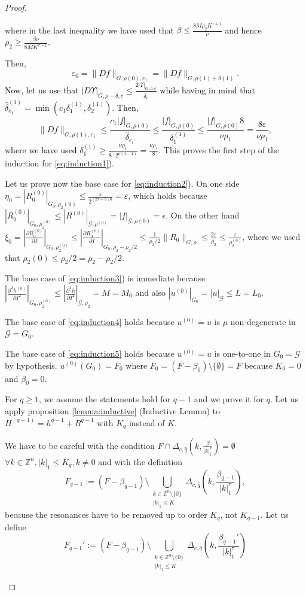 \begin{proof}
\begin{enumerate}
where in the last inequality we have used that $\beta \leq \frac{8M\rho_2 K^{\tau+1}}{\nu}$ and hence $\rho_2 \geq \frac{\beta\nu}{8 M K^{\tau+1}}$.

Then,
\textcolor{black}{
$$\varepsilon_0 = \|Df\|_{G,\rho(0),c_1} = \|Df\|_{G,\rho(1)+\delta(1)}.$$
Now, let us use that $|D\Upsilon|_{G,\rho-\delta,c}\leq \frac{2|\Upsilon|_{G,\rho,c}}{\hat \delta_c}$ while having in mind that $\hat \delta_{c_1}^{(1)} = \min(c_1\delta_1^{(1)},\delta_2^{(1)})$.
Then,
$$\|D f\|_{G,\rho(1),c_1} \leq \frac{c_1 |f|_{G,\rho(0)}}{\hat \delta_{c_1}} \leq \frac{|f|_{G,\rho(0)}}{\delta_1^{(1)}} \leq \frac{|f|_{G,\rho(0)} 8}{\nu \rho_1} = \frac{8\varepsilon}{\nu \rho_1},$$
where we have used $\delta_1^{(1)}\geq \frac{\nu \rho_1}{8\cdot 2^{\nu(1-1)}} = \frac{\nu\rho_1}{8}$.
}
This proves the first step of the induction  for \ref{eq:induction1}).

Let us prove now the base case for \ref{eq:induction2}).
On one side $\eta_0 = |R_0^{(0)}|_{G_0,\rho_2(0)} \leq \frac{\varepsilon}{2^{(2\tau+3)0}} = \varepsilon$, which holds because $|R_0^{(0)}|_{G_0,\rho_2^{(0)}} \leq |R^{(0)}|_{\mathcal{G},\rho^{(0)}} = |f|_{\mathcal{G},\rho(0)} = \epsilon$.
On the other hand $\xi_0 = |\frac{\partial R_0^{(0)}}{\partial I}|_{G_0,\rho_2^{(0)}} \leq |\frac{\partial R_0^{(0)}}{\partial I}|_{G_0,\rho_2 -\rho_2/2} \leq \frac{1}{\rho_2/2}\|R_0\|_{G,\rho} \leq \frac{2\varepsilon}{\rho_2} \leq \frac{\varepsilon}{\rho_2^{(0)}}$, where we used that $\rho_2(0) \leq \rho_2/2 = \rho_2 - \rho_2/2$.

The base case of \ref{eq:induction3}) is immediate because $|\frac{\partial^2 h^{(0)}}{\partial I^2}|_{G_0,\rho_2^{(0)}} \leq |\frac{\partial^2 h}{\partial I^2}|_{\mathcal{G},\rho_2} = M = M_0$ and also $|u^{(0)}|_{G_0} = |u|_{\mathcal{G}} \leq L = L_0$.

The base case of \ref{eq:induction4} holds because $u^{(0)} = u$ is $\mu$ non-degenerate in $\mathcal{G} = G_0$.

The base case of \ref{eq:induction5} holds because $u^{(0)} = u$ is one-to-one in $G_0 = \mathcal{G}$ by hypothesis. $u^{(0)}(G_0) = F_0$ where $F_0 = (F - \beta_0)\setminus \{\emptyset\} = F$ because $K_0 = 0$ and $\beta_0 = 0$.

For $q \geq 1$, we assume the statements hold for $q-1$ and we prove it for $q$. Let us apply proposition \ref{lemma:inductive} (Inductive Lemma) to $H^{(q-1)} = h^{q-1} + R^{q-1}$ with $K_q$ instead of $K$.

We have to be careful with the condition $F\cap \Delta_{c,\hat q}(k,\frac{\beta}{|k|_1^\tau}) = \emptyset$ $\forall k \in \mathbb{Z}^n, |k|_1 \leq K_q, k\neq 0$ and with the definition
$$F_{q-1}:=(F - \beta_{q-1}) \setminus \bigcup_{\substack{k\in\mathbb{Z}^n\setminus\{0\} \\ |k|_1 \leq K}} \Delta_{c,\hat q}(k,\frac{\beta_{q-1}}{|k|_1^\tau}),$$
 because the resonances have to be removed up to order $K_q$, not $K_{q-1}$.
Let us define
$$F_{q-1}':= (F-\beta_{q-1}) \setminus \bigcup_{\substack{k\in\mathbb{Z}^n\setminus\{0\} \\ |k|_1 \leq K}} \Delta_{c,\hat q}(k,\frac{\beta_{q-1}'}{|k|_1^\tau})$$


\end{enumerate}
\end{proof}
